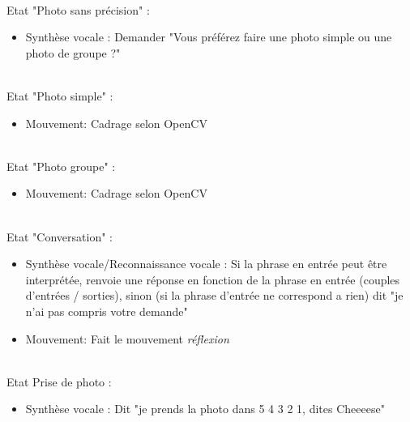\ \\
Etat "Photo sans précision" :
\begin{itemize} 
    \item Synthèse vocale : Demander "Vous préférez faire une photo simple ou une photo de groupe ?"
\end{itemize}
\ \\
Etat "Photo simple" :
\begin{itemize}
    \item Mouvement: Cadrage selon OpenCV
\end{itemize}
\ \\
Etat "Photo groupe" :
\begin{itemize}
    \item Mouvement: Cadrage selon OpenCV
\end{itemize}
\ \\
Etat "Conversation" : 
\begin{itemize}
    \item Synthèse vocale/Reconnaissance vocale : Si la phrase en entrée peut être interprétée, renvoie une réponse en fonction de la phrase en entrée (couples d'entrées / sorties), sinon (si la phrase d'entrée ne correspond a rien) dit "je n'ai pas compris votre demande"
    \item Mouvement: Fait le mouvement \textit{réflexion} 
    \end{itemize}
\ \\
Etat Prise de photo :
    \begin{itemize}
    \item Synthèse vocale : Dit "je prends la photo dans 5 4 3 2 1, dites Cheeeese"
    \end{itemize}

\newpage

